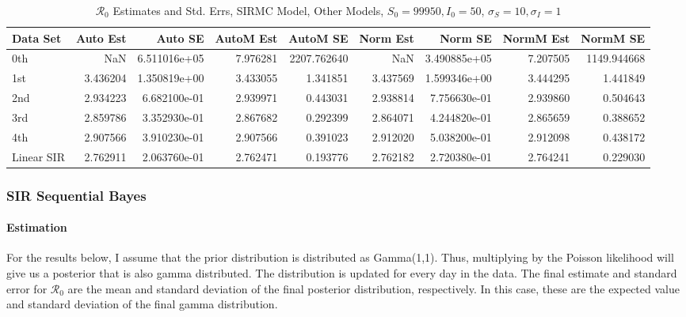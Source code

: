 \documentclass[12pt]{article}
\newcommand{\rr}{\ensuremath{\mathcal{R}_0}}
\begin{document}
\begin{table}[H]
	
	\caption{$\rr$ Estimates and Std. Errs, SIRMC Model,
		Other Models, $S_0 = 99950, I_0 = 50$, 
		$\sigma_S = 10, \sigma_I = 1$}
	\begin{footnotesize}
		\hskip -1cm
	\begin{tabular}{l|r|r|r|r|r|r|r|r}
		\hline
		Data Set & Auto Est & Auto SE & AutoM Est & AutoM SE & Norm Est & Norm SE & NormM Est & NormM SE\\
		\hline
		0th & NaN & 6.511016e+05 & 7.976281 & 2207.762640 & NaN & 3.490885e+05 & 7.207505 & 1149.944668\\
		\hline
		1st & 3.436204 & 1.350819e+00 & 3.433055 & 1.341851 & 3.437569 & 1.599346e+00 & 3.444295 & 1.441849\\
		\hline
		2nd & 2.934223 & 6.682100e-01 & 2.939971 & 0.443031 & 2.938814 & 7.756630e-01 & 2.939860 & 0.504643\\
		\hline
		3rd & 2.859786 & 3.352930e-01 & 2.867682 & 0.292399 & 2.864071 & 4.244820e-01 & 2.865659 & 0.388652\\
		\hline
		4th & 2.907566 & 3.910230e-01 & 2.907566 & 0.391023 & 2.912020 & 5.038200e-01 & 2.912098 & 0.438172\\
		\hline
		Linear SIR & 2.762911 & 2.063760e-01 & 2.762471 & 0.193776 & 2.762182 & 2.720380e-01 & 2.764241 & 0.229030\\
		\hline
	\end{tabular}
\end{footnotesize}
\end{table}

\subsubsection{SIR Sequential Bayes}

\paragraph{Estimation}

For the results below, I assume that the prior distribution is distributed as Gamma(1,1). Thus, multiplying by the Poisson likelihood will give us a posterior that is also gamma distributed. The distribution is updated for every day in the data. The final estimate and standard error for $\rr$ are the mean and standard deviation of the final posterior distribution, respectively. In this case, these are the expected value and standard deviation of the final gamma distribution. 
\end{document}
